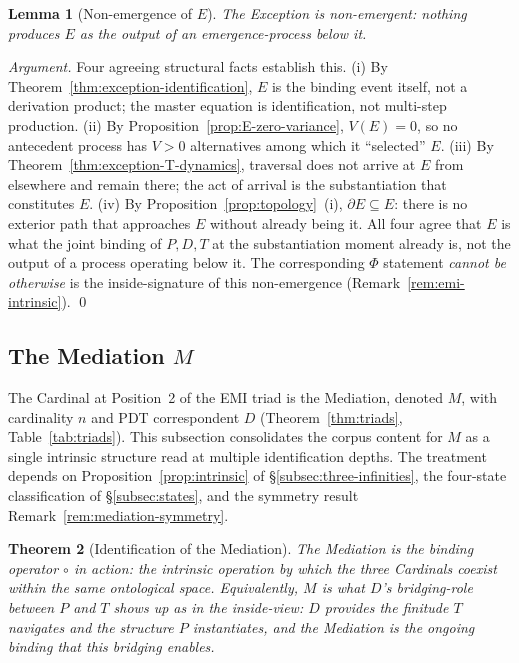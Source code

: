 \documentclass[11pt,a4paper]{article}
\newtheorem{theorem}{Theorem}[section]
\newtheorem{lemma}[theorem]{Lemma}
\theoremstyle{definition}
\theoremstyle{remark}
\begin{document}
\begin{lemma}[Non-emergence of $E$]\label{lem:emergent-E}
The Exception is non-emergent: nothing produces $E$ as the output of an emergence-process below it.
\end{lemma}

\begin{proof}[Argument]
Four agreeing structural facts establish this. (i) By Theorem~\ref{thm:exception-identification}, $E$ is the binding event itself, not a derivation product; the master equation is identification, not multi-step production. (ii) By Proposition~\ref{prop:E-zero-variance}, $V(E) = 0$, so no antecedent process has $V > 0$ alternatives among which it ``selected'' $E$. (iii) By Theorem~\ref{thm:exception-T-dynamics}, traversal does not arrive at $E$ from elsewhere and remain there; the act of arrival is the substantiation that constitutes $E$. (iv) By Proposition~\ref{prop:topology}~(i), $\partial E \subseteq E$: there is no exterior path that approaches $E$ without already being it. All four agree that $E$ is what the joint binding of $P,D,T$ at the substantiation moment already is, not the output of a process operating below it. The corresponding $\Phi$ statement \emph{cannot be otherwise} is the inside-signature of this non-emergence (Remark~\ref{rem:emi-intrinsic}). \qed
\end{proof}

\subsection{The Mediation $M$}\label{subsec:mediation}

The Cardinal at Position~2 of the EMI triad is the Mediation, denoted $M$, with cardinality $n$ and PDT correspondent $D$ (Theorem~\ref{thm:triads}, Table~\ref{tab:triads}). This subsection consolidates the corpus content for $M$ as a single intrinsic structure read at multiple identification depths. The treatment depends on Proposition~\ref{prop:intrinsic} of \S\ref{subsec:three-infinities}, the four-state classification of \S\ref{subsec:states}, and the symmetry result Remark~\ref{rem:mediation-symmetry}.

\begin{theorem}[Identification of the Mediation]\label{thm:mediation-identification}
The Mediation is the binding operator $\circ$ in action: the intrinsic operation by which the three Cardinals coexist within the same ontological space. Equivalently, $M$ is what $D$'s bridging-role between $P$ and $T$ shows up as in the inside-view: $D$ provides the finitude $T$ navigates and the structure $P$ instantiates, and the Mediation is the ongoing binding that this bridging enables.
\end{theorem}
\end{document}
